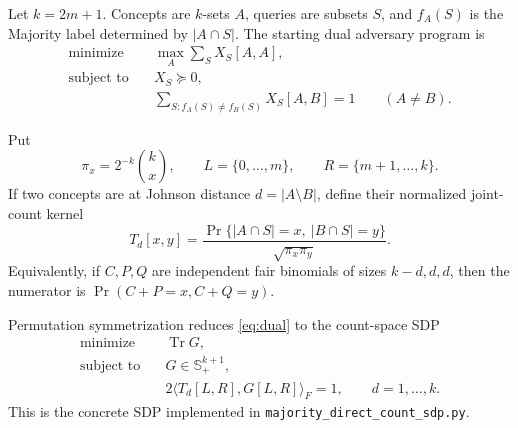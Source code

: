 \documentclass[11pt]{article}
\newcommand{\1}{\mathbf 1}
\newcommand{\Tr}{\operatorname{Tr}}
\newcommand{\ip}[2]{\langle #1,#2\rangle}
\begin{document}
Let $k=2m+1$.  Concepts are $k$-sets $A$, queries are subsets $S$, and
$f_A(S)$ is the Majority label determined by $|A\cap S|$.  The starting dual
adversary program is
\begin{equation}
 \begin{aligned}
 \text{minimize}\quad & \max_A\sum_S X_S[A,A],\\
 \text{subject to}\quad &X_S\succeq0,\\
 &\sum_{S:f_A(S)\ne f_B(S)}X_S[A,B]=1
       \qquad(A\ne B).
 \end{aligned}                                           \tag{D}\label{eq:dual}
\end{equation}

Put
\[
 \pi_x=2^{-k}\binom{k}{x},\qquad L=\{0,\ldots,m\},
 \qquad R=\{m+1,\ldots,k\}.
\]
If two concepts are at Johnson distance $d=|A\setminus B|$, define their
normalized joint-count kernel
\begin{equation}
 T_d[x,y]=\frac{\Pr\{|A\cap S|=x,\ |B\cap S|=y\}}
                 {\sqrt{\pi_x\pi_y}}.                   \label{eq:kernel}
\end{equation}
Equivalently, if $C,P,Q$ are independent fair binomials of sizes
$k-d,d,d$, then the numerator is $\Pr(C+P=x,C+Q=y)$.

Permutation symmetrization reduces \eqref{eq:dual} to the count-space SDP
\begin{equation}
 \boxed{
 \begin{aligned}
  \text{minimize}\quad &\Tr G,\\
  \text{subject to}\quad&G\in\mathbb S_+^{k+1},\\
  &2\ip{T_d[L,R]}{G[L,R]}_F=1,\qquad d=1,\ldots,k .
 \end{aligned}}                                         \tag{P$_k$}\label{eq:count-sdp}
\end{equation}
This is the concrete SDP implemented in
\texttt{majority\_direct\_count\_sdp.py}.
\end{document}
